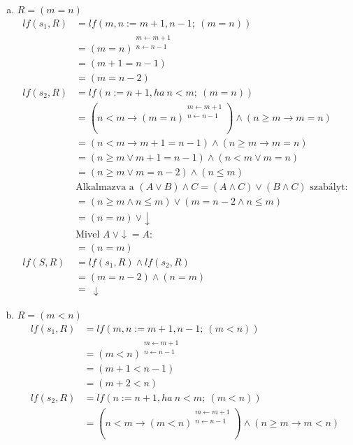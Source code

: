 \documentclass[12pt]{article}
\begin{document}
\begin{enumerate}
		\begin{enumerate}[a)]
			\item $R = (m = n)$
			\begin{align*}
			lf(s_1, R) &= lf(m,n := m+1, n-1;\ (m = n)) \\
			&= (m = n)^{\substack{ m \leftarrow m + 1 \\ n \leftarrow n - 1 }} \\
			&= (m+1 = n-1) \\
			&= (m = n-2) \\
			lf(s_2, R) &= lf(n := n + 1, ha\ n < m;\ (m = n)) \\
			&= (n < m \rightarrow (m = n)^{\substack{ m \leftarrow m + 1 \\ n \leftarrow n - 1 }}) \land (n \ge m \rightarrow m = n) \\
			&= (n < m \rightarrow m + 1 = n - 1) \land (n \ge m \rightarrow m = n) \\
			&= (n \ge m \lor m + 1 = n - 1) \land (n < m \lor m = n) \\
			&= (n \ge m \lor m = n - 2) \land (n \leq m) \\
			&\text{Alkalmazva a } (A \lor B) \land C = (A \land C) \lor (B \land C) \text{ szabályt:} \\
			&= (n \ge m \land n \leq m) \lor (m = n - 2 \land n \leq m) \\
			&= (n = m)\ \lor \downarrow \\
			&\text{Mivel } A\ \lor \downarrow = A: \\
			&= (n = m) \\
			lf(S, R) &= lf(s_1, R) \land lf(s_2, R) \\
			&= (m = n-2) \land (n = m) \\
			&=\ \downarrow
			\end{align*}
			\item $R = (m < n)$
			\begin{align*}
			lf(s_1, R) &= lf(m,n := m+1, n-1;\ (m < n)) \\
			&= (m < n)^{\substack{ m \leftarrow m + 1 \\ n \leftarrow n - 1 }} \\
			&= (m+1 < n-1) \\
			&= (m+2 < n) \\
			lf(s_2, R) &= lf(n := n + 1, ha\ n < m;\ (m < n)) \\
			&= (n < m \rightarrow (m < n)^{\substack{ m \leftarrow m + 1 \\ n \leftarrow n - 1 }}) \land (n \ge m \rightarrow m < n) \\

\end{align*}
\end{enumerate}
\end{enumerate}
\end{document}
